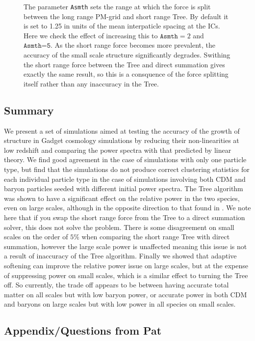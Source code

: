 \documentclass[]{article}
\begin{document}
\begin{figure}[h]
	\caption{The parameter \texttt{Asmth} sets the range at which the force is split between the long range PM-grid and short range Tree. By default it is set to 1.25 in units of the mean interpaticle spacing at the ICs. Here we check the effect of increasing this to $\texttt{Asmth}=2$ and $\texttt{Asmth=5}$. As the short range force becomes more prevalent, the accuracy of the small scale structure significantly degrades. Swithing the short range force between the Tree and direct summation gives exactly the same result, so this is a consquence of the force splitting itself rather than any inaccuracy in the Tree.}
\end{figure}

\clearpage
\subsection{Summary}
We present a set of simulations aimed at testing the accuracy of the growth of structure in Gadget cosmology simulations by reducing their non-linearities at low redshift and comparing the power spectra with that predicted by linear theory. We find good agreement in the case of simulations with only one particle type, but find that the simulations do not produce correct clustering statistics for each individual particle type in the case of simulations involving both CDM and baryon particles seeded with different initial power spectra. The Tree algorithm was shown to have a significant effect on the relative power in the two species, even on large scales, although in the opposite direction to that found in \cite{Angulo2013}. We note here that if you swap the short range force from the Tree to a direct summation solver, this does not solve the problem. There is some disagreement on small scales on the order of $5\%$ when comparing the short range Tree with direct summation, however the large scale power is unaffected meaning this issue is not a result of inaccuracy of the Tree algorithm. Finally we showed that adaptive softening can improve the relative power issue on large scales, but at the expense of suppressing power on small scales, which is a similar effect to turning the Tree off. So currently, the trade off appears to be between having accurate total matter on all scales but with low baryon power, or accurate power in both CDM and baryons on large scales but with low power in all species on small scales.

\subsection{Appendix/Questions from Pat}



\end{document}
